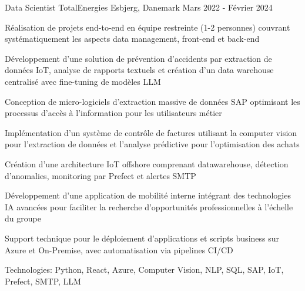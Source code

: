 \begin{cventries}
\cventry
{Data Scientist} %
{TotalEnergies} %
{Esbjerg, Danemark} %
{Mars 2022 - Février 2024} %
{ %
\begin{cvitems}
\item {Réalisation de projets end-to-end en équipe restreinte (1-2 personnes) couvrant systématiquement les aspects data management, front-end et back-end}
\item {Développement d'une solution de prévention d'accidents par extraction de données IoT, analyse de rapports textuels et création d'un data warehouse centralisé avec fine-tuning de modèles LLM}
\item {Conception de micro-logiciels d'extraction massive de données SAP optimisant les processus d'accès à l'information pour les utilisateurs métier}
\item {Implémentation d'un système de contrôle de factures utilisant la computer vision pour l'extraction de données et l'analyse prédictive pour l'optimisation des achats}
\item {Création d'une architecture IoT offshore comprenant datawarehouse, détection d'anomalies, monitoring par Prefect et alertes SMTP}
\item {Développement d'une application de mobilité interne intégrant des technologies IA avancées pour faciliter la recherche d'opportunités professionnelles à l'échelle du groupe}
\item {Support technique pour le déploiement d'applications et scripts business sur Azure et On-Premise, avec automatisation via pipelines CI/CD}
\item {Technologies: Python, React, Azure, Computer Vision, NLP, SQL, SAP, IoT, Prefect, SMTP, LLM}
\end{cvitems}
}
\vspace{1.5em}



\end{cventries}
